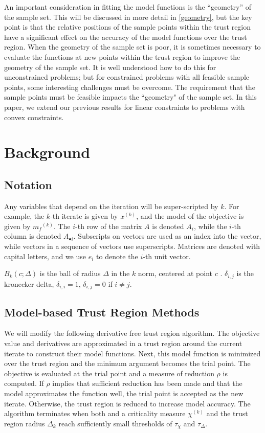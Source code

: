 \documentclass{article}
\theoremstyle{case}
\newcommand{\modelk}{{{m}_f}^{(k)}}
\newcommand{\iteratek}{{x}^{(k)}}
\newcommand{\chik}{{\chi^{(k)}}}
\begin{document}
An important consideration in fitting the model functions is the ``geometry'' of the sample set.
This will be discussed in more detail in \cref{geometry}, but the key point is that the relative positions of the sample points within the trust region have a significant effect on the accuracy of the model functions over the trust region.
When the geometry of the sample set is poor, it is sometimes necessary to evaluate the functions at new points within the trust region to improve the geometry of the sample set.
It is well understood how to do this for unconstrained problems; but for constrained problems with all feasible sample points, some interesting challenges must be overcome.
The requirement that the sample points must be feasible impacts the ``geometry" of the sample set.
In this paper, we extend our previous results for linear constraints to problems with convex constraints.
\section{Background}

\subsection{Notation}

Any variables that depend on the iteration will be super-scripted by $k$.
For example, the $k$-th iterate is given by $\iteratek$, and the model of the objective is given by $\modelk$.
The $i$-th row of the matrix $A$ is denoted $A_i$, while the $i$-th column is denoted $A_{\bullet i}$.
Subscripts on vectors are used as an index into the vector, while vectors in a sequence of vectors use superscripts.
Matrices are denoted with capital letters, and we use $e_i$ to denote the $i$-th unit vector.                     %

$B_k(c; \Delta)$ is the ball of radius $\Delta$ in the $k$ norm, centered at point $c$ .
$\delta_{i,j}$ is the kronecker delta, $\delta_{i,i} = 1$, $\delta_{i,j} = 0$ if $i\ne j$.


\subsection{Model-based Trust Region Methods}

We will modify the following derivative free trust region algorithm.
The objective value and derivatives are approximated in a trust region around the current iterate to construct their model functions.
Next, this model function is minimized over the trust region and the minimum argument becomes the trial point.
The objective is evaluated at the trial point and a measure of reduction $\rho$ is computed.
If $\rho$ implies that sufficient reduction has been made and that the model approximates the function well, the trial point is accepted as the new iterate.
Otherwise, the trust region is reduced to increase model accuracy.
The algorithm terminates when both and a criticality measure $\chik$ and the trust region radius $\Delta_k$ reach sufficiently small thresholds of $\tau_{\chi}$ and $\tau_{\Delta}$.
\end{document}
